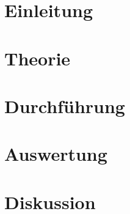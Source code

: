 \documentclass[a4paper, 12pt]{article}
\begin{document}
\thispagestyle{empty}
\newpage
\thispagestyle{empty}
\tableofcontents
\newpage

\pagestyle{fancy}
\setcounter{page}{1}

\section{Einleitung}

\section{Theorie}


\section{Durchführung}
%

\section{Auswertung}

%
%

%
\section{Diskussion}

\end{document}
